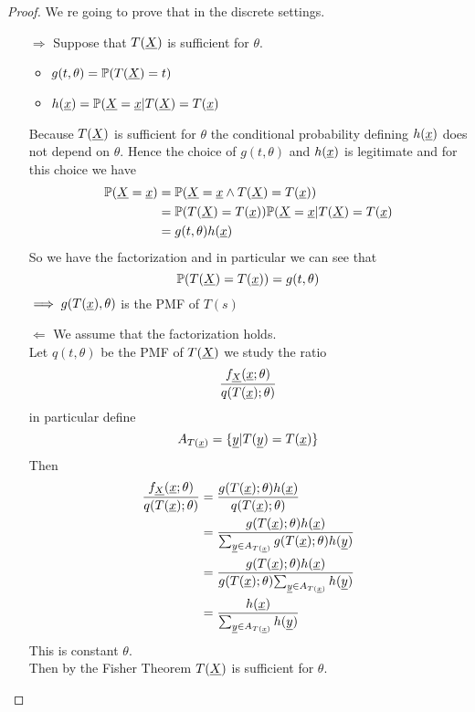 \begin{proof}
	We re going to prove that in the discrete settings.\\
	\begin{itemize}
		\item[$\Rightarrow$] Suppose that $T(\underline X)$ is sufficient for $\theta$.\\
		\begin{itemize}
			\item $g(t,\theta)=\mathbb{P}(T(\underline X)=t)$
			\item $h(\underline x)=\mathbb{P}(\underline X=\underline x|T(\underline X)=T(\underline x)$
		\end{itemize}
	Because $T(\underline X)$ is sufficient for $\theta$ the conditional probability defining $h(\underline x)$ does not depend on $\theta$. Hence the choice of $g(t,\theta)$ and $h(\underline x)$ is legitimate and for this choice we have
	\[
	\begin{split}
	\mathbb{P}(\underline X=\underline x)
	&=\mathbb{P}(\underline X=\underline x \wedge T(\underline X)=T(\underline x))\\
	&=\mathbb{P}(T(\underline X)=T(\underline x))\mathbb{P}(\underline X=\underline x|T(\underline X)=T(\underline x)\\
	&=g(t,\theta)h(\underline x)
	\end{split}
	\]
	So we have the factorization and in particular we can see that
	$$\mathbb{P}(T(\underline X)=T(\underline x))=g(t,\theta)$$
	$\implies g(T(\underline x),\theta)$ is the PMF of $T(s)$
	\item[$\Leftarrow$] We assume that the factorization holds.\\
	Let $q(t,\theta)$ be the PMF of $T(\underline X)$ we study the ratio
	$$\frac{f_{\underline X}(\underline{x};\theta)}{q(T(\underline x);\theta)}$$
	in particular define
	$$A_{T(\underline x)}=\{\underline y | T(\underline y)= T(\underline x) \}$$
	Then 
	\[
	\begin{split}
	\frac{f_{\underline X}(\underline{x};\theta)}{q(T(\underline x);\theta)}
	&=\frac{g(T(\underline x);\theta)h(\underline x)}{q(T(\underline x);\theta)}\\
	&=\frac{g(T(\underline x);\theta)h(\underline x)}{\sum_{\underline y \in A_{T(\underline x)}}{g(T(\underline x);\theta)h(\underline y)}}\\
	&=\frac{g(T(\underline x);\theta)h(\underline x)}{g(T(\underline x);\theta) {\sum_{\underline y \in A_{T(\underline x)}}h(\underline y)}}\\
	&=\frac{h(\underline x)}{\sum_{\underline y \in A_{T(\underline x)}}h(\underline y)}
	\end{split}
	\]
	This is constant \wrt $\theta$.\\
	Then by the Fisher Theorem $T(\underline X)$ is sufficient for $\theta$.
	\end{itemize}

\end{proof}


